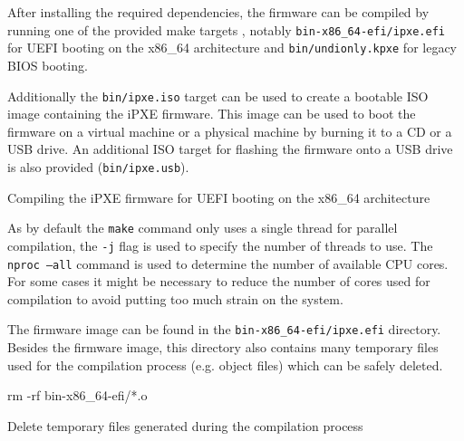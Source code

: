 \documentclass[../main.tex]{subfiles}
\begin{document}
After installing the required dependencies, the firmware can be compiled by running
one of the provided make targets \cite{ipxe_build_targets}, notably \texttt{bin-x86\_64-efi/ipxe.efi} for UEFI
booting on the x86\_64 architecture and \texttt{bin/undionly.kpxe} for legacy BIOS booting.

Additionally the \texttt{bin/ipxe.iso} target can be used to create a bootable ISO image containing the iPXE firmware.
This image can be used to boot the firmware on a virtual machine or a physical machine by burning it to a CD or a USB drive.
An additional ISO target for flashing the firmware onto a USB drive is also provided (\texttt{bin/ipxe.usb}).

\begin{listing}[H]

  \caption{Compiling the iPXE firmware for UEFI booting on the x86\_64 architecture}
\end{listing}

As by default the \texttt{make} command only uses a single
thread for parallel compilation, the \texttt{-j} flag is used to specify the number of threads to use.
The \texttt{nproc --all} command is used to determine the number of available CPU cores.
For some cases it might be necessary to reduce the number of cores used for compilation
to avoid putting too much strain on the system.

The firmware image can be found in the \texttt{bin-x86\_64-efi/ipxe.efi} directory.
Besides the firmware image, this directory also contains many temporary files used for the compilation process (e.g. object files)
which can be safely deleted.

\begin{listing}[H]
  \begin{bashcode}
    rm -rf bin-x86_64-efi/*.o
  \end{bashcode}

  \caption{Delete temporary files generated during the compilation process}
\end{listing}
\end{document}
